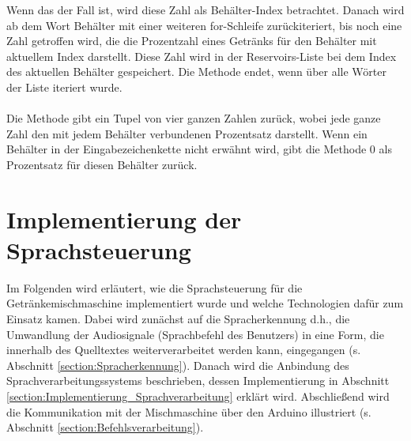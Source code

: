 Wenn das der Fall ist, wird diese Zahl als Behälter-Index betrachtet. Danach wird ab dem Wort Behälter mit einer weiteren for-Schleife zurückiteriert, bis noch eine Zahl getroffen wird, die die Prozentzahl eines Getränks für den Behälter mit aktuellem Index darstellt.
Diese Zahl wird in der Reservoirs-Liste bei dem Index des aktuellen Behälter gespeichert. 
Die Methode endet, wenn über alle Wörter der Liste iteriert wurde.\\\\
Die Methode gibt ein Tupel von vier ganzen Zahlen zurück, wobei jede ganze Zahl den mit jedem Behälter verbundenen Prozentsatz darstellt. 
Wenn ein Behälter in der Eingabezeichenkette nicht erwähnt wird, gibt die Methode 0 als Prozentsatz für diesen Behälter zurück.
\section{Implementierung der Sprachsteuerung}
Im Folgenden wird erläutert, wie die Sprachsteuerung für die Getränkemischmaschine implementiert wurde und welche Technologien dafür zum Einsatz kamen. Dabei wird zunächst auf die Spracherkennung d.h., die Umwandlung der Audiosignale (Sprachbefehl des Benutzers) in eine Form, die innerhalb des Quelltextes weiterverarbeitet werden kann, eingegangen (s. Abschnitt \ref{section:Spracherkennung}). Danach wird die Anbindung des Sprachverarbeitungssystems beschrieben, dessen Implementierung in Abschnitt \ref{section:Implementierung_Sprachverarbeitung} erklärt wird. Abschließend wird die Kommunikation mit der Mischmaschine über den Arduino illustriert (s. Abschnitt \ref{section:Befehlsverarbeitung}).

